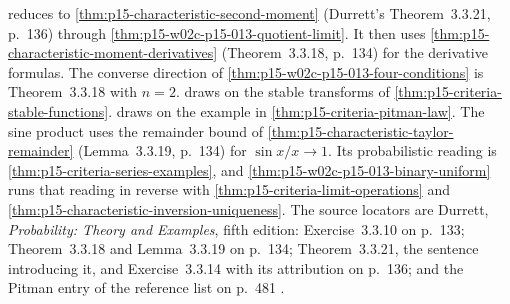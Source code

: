 reduces to
\cref{thm:p15-characteristic-second-moment} (Durrett's Theorem~3.3.21,
p.~136) through \cref{thm:p15-w02c-p15-013-quotient-limit}. It then
uses \cref{thm:p15-characteristic-moment-derivatives} (Theorem~3.3.18,
p.~134) for the derivative formulas. The converse direction of
\cref{thm:p15-w02c-p15-013-four-conditions} is Theorem~3.3.18 with \(n=2\).
 draws on the stable
transforms of \cref{thm:p15-criteria-stable-functions}.
 draws on the example in
\cref{thm:p15-criteria-pitman-law}.
The sine product uses the remainder bound of
\cref{thm:p15-characteristic-taylor-remainder} (Lemma~3.3.19, p.~134) for
\(\sin x/x\to1\). Its probabilistic reading is
\cref{thm:p15-criteria-series-examples}, and
\cref{thm:p15-w02c-p15-013-binary-uniform} runs that reading in reverse with
\cref{thm:p15-criteria-limit-operations} and
\cref{thm:p15-characteristic-inversion-uniqueness}.
The source locators are Durrett, \emph{Probability: Theory and Examples},
fifth edition: Exercise~3.3.10 on p.~133; Theorem~3.3.18 and
Lemma~3.3.19 on p.~134; Theorem~3.3.21, the sentence introducing it, and
Exercise~3.3.14 with its attribution on p.~136; and the Pitman entry of the
reference list on p.~481 \cite{DurrettPTEAuthor2019}.
